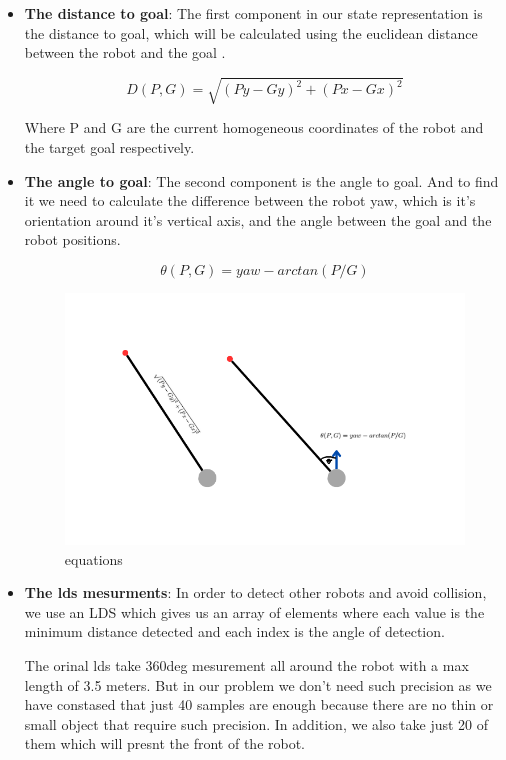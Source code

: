 \documentclass[12pt]{extarticle}
\begin{document}
\begin{itemize}
\item \textbf{The distance to goal}: 
The first component in our state representation is the distance to goal, which will be calculated using the euclidean distance  between the robot and the goal .


\[ D(P,G)=\sqrt{(Py-Gy)^2+(Px-Gx)^2}  \] 

Where P and G are the current homogeneous coordinates of the robot and the target goal respectively.

\item \textbf{The angle to goal}: 
The second component  is the angle  to goal. And to find it we need to calculate  the difference between the robot yaw, which is it's orientation around it's vertical axis, and the angle between the goal and the robot positions.


\[ \theta(P,G)=yaw-arctan(P/G)  \] 

 \begin{figure}[h]  
\centering
\includegraphics[scale=0.8]{equations}
\caption[equations]{equations}
\end{figure}


\item \textbf{The lds  mesurments}: 
In order to detect other robots and avoid collision, we use an  LDS   which gives us an array of elements where each value is the minimum distance detected and each index is the angle of detection.

The orinal lds take 360deg mesurement all around the robot with a max length of 3.5 meters. But in our problem we don't need such precision as we have constased that  just 40 samples are enough because there are no thin or small object that require such precision. In addition, we also take  just 20 of them  which will presnt the front of the robot.





\end{itemize}
\end{document}
